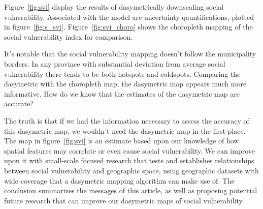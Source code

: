 \documentclass[draft]{article}
\begin{document}




Figure~\ref{fig:svi} display the results of dasymetrically downscaling social vulnerability.  Associated with the model are uncertainty qauntifications, plotted in figure~\ref{fig:s_svi}.  Figure~\ref{fig:svi_choro} shows the choropleth mapping of the social vulnerability index for comparison.

It's notable that the social vulnerability mapping doesn't follow the municipality borders.  In any province with substantial deviation from average social vulnerability there tends to be both hotspots and coldspots.  Comparing the dasymetric with the choropleth map, the dasymetric map appears much more informative.  How do we know that the estimates of the dasymetric map are accurate?

The truth is that if we had the information necessary to assess the accuracy of this dasymetric map, we wouldn't need the dasymetric map in the first place.  The map in figure~\ref{fig:svi} is an estimate based upon our knowledge of how spatial features may correlate or even cause social vulnerability.  We can improve upon it with small-scale focused research that tests and establishes relationships between social vulnerability and geographic space, using geographic datasets with wide coverage that a dasymetric mapping algorithm can make use of.  The conclusion summarizes the messages of this article, as well as proposing potential future research that can improve our dasymetric maps of social vulnerability.
\end{document}
